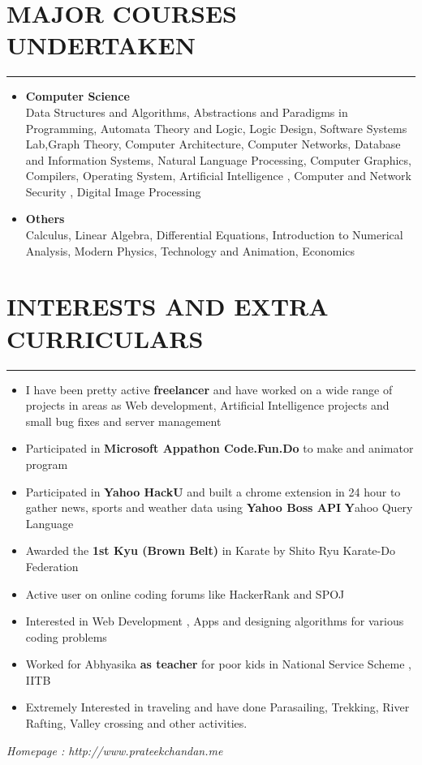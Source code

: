 \documentclass[11pt]{article} %
\begin{document}
\section*{MAJOR COURSES UNDERTAKEN}
\vspace{-3mm}
\hrule
\medskip
\begin{itemize}
\itemsep -0.4em
\item
{\bf Computer Science}\\
Data Structures and Algorithms, Abstractions and Paradigms in Programming, Automata Theory and Logic, Logic Design, Software Systems Lab,Graph Theory, Computer Architecture, Computer Networks, Database and Information Systems, Natural Language Processing, Computer Graphics, Compilers, Operating
System, Artificial Intelligence , Computer and Network Security , Digital Image Processing

\item
{\bf Others}\\
Calculus, Linear Algebra, Differential Equations, Introduction to Numerical Analysis, Modern Physics, Technology and Animation, Economics\\
\end{itemize}
\vspace{-9mm}
\vspace{-3mm}

\section*{INTERESTS AND EXTRA CURRICULARS}
\vspace{-3mm}
\hrule
\medskip
\begin{itemize}
\itemsep-0.4em
\item I have been pretty active \textbf{freelancer} and have worked on a wide range of projects in areas as Web development, Artificial Intelligence projects and small bug fixes and server management
\item Participated in \textbf{Microsoft Appathon Code.Fun.Do} to make and animator program
\item Participated in \textbf{Yahoo HackU} and built a chrome extension in 24 hour to gather news, sports and weather data using {\bf Yahoo Boss API} {\textbf Yahoo Query Language}
\item Awarded the \textbf{1st Kyu (Brown Belt)} in Karate by Shito Ryu Karate-Do Federation
\item Active user on online coding forums like HackerRank and SPOJ
\item Interested in Web Development , Apps and designing algorithms for various coding problems
\item Worked for Abhyasika \textbf{as teacher }for poor kids in National Service Scheme , IITB
\item Extremely Interested in traveling and  have done Parasailing, Trekking, River Rafting, Valley crossing 
and other activities.
\end{itemize}
\textit{Homepage : http://www.prateekchandan.me}
\end{document}
